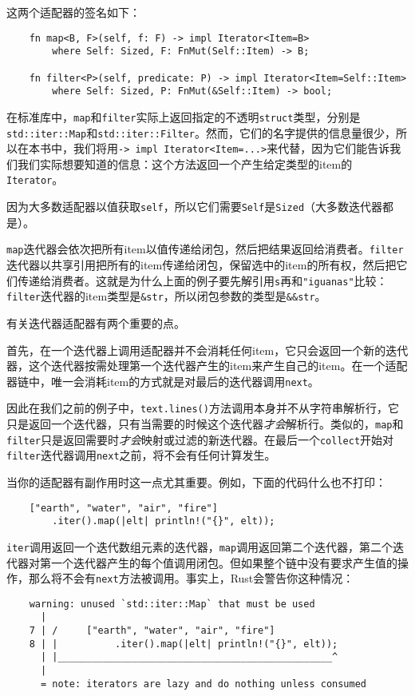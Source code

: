 这两个适配器的签名如下：
\begin{verbatim}
    fn map<B, F>(self, f: F) -> impl Iterator<Item=B>
        where Self: Sized, F: FnMut(Self::Item) -> B;

    fn filter<P>(self, predicate: P) -> impl Iterator<Item=Self::Item>
        where Self: Sized, P: FnMut(&Self::Item) -> bool;
\end{verbatim}

在标准库中，\texttt{map}和\texttt{filter}实际上返回指定的不透明\texttt{struct}类型，分别是\texttt{std::iter::Map}和\texttt{std::iter::Filter}。然而，它们的名字提供的信息量很少，所以在本书中，我们将用\texttt{-> impl Iterator<Item=...>}来代替，因为它们能告诉我们我们实际想要知道的信息：这个方法返回一个产生给定类型的item的\texttt{Iterator}。

因为大多数适配器以值获取\texttt{self}，所以它们需要\texttt{Self}是\texttt{Sized}（大多数迭代器都是）。

\texttt{map}迭代器会依次把所有item以值传递给闭包，然后把结果返回给消费者。\texttt{filter}迭代器以共享引用把所有的item传递给闭包，保留选中的item的所有权，然后把它们传递给消费者。这就是为什么上面的例子要先解引用\texttt{s}再和\texttt{"iguanas"}比较：\texttt{filter}迭代器的item类型是\texttt{\&str}，所以闭包参数的类型是\texttt{\&\&str}。

有关迭代器适配器有两个重要的点。

首先，在一个迭代器上调用适配器并不会消耗任何item，它只会返回一个新的迭代器，这个迭代器按需处理第一个迭代器产生的item来产生自己的item。在一个适配器链中，唯一会消耗item的方式就是对最后的迭代器调用\texttt{next}。

因此在我们之前的例子中，\texttt{text.lines()}方法调用本身并不从字符串解析行，它只是返回一个迭代器，只有当需要的时候这个迭代器\emph{才会}解析行。类似的，\texttt{map}和\texttt{filter}只是返回需要时\emph{才会}映射或过滤的新迭代器。在最后一个\texttt{collect}开始对\texttt{filter}迭代器调用\texttt{next}之前，将不会有任何计算发生。

当你的适配器有副作用时这一点尤其重要。例如，下面的代码什么也不打印：
\begin{verbatim}
    ["earth", "water", "air", "fire"]
        .iter().map(|elt| println!("{}", elt));
\end{verbatim}

\texttt{iter}调用返回一个迭代数组元素的迭代器，\texttt{map}调用返回第二个迭代器，第二个迭代器对第一个迭代器产生的每个值调用闭包。但如果整个链中没有要求产生值的操作，那么将不会有\texttt{next}方法被调用。事实上，Rust会警告你这种情况：
\begin{verbatim}
    warning: unused `std::iter::Map` that must be used
      |
    7 | /     ["earth", "water", "air", "fire"]
    8 | |          .iter().map(|elt| println!("{}", elt));
      | |________________________________________________^
      |
      = note: iterators are lazy and do nothing unless consumed
\end{verbatim}

